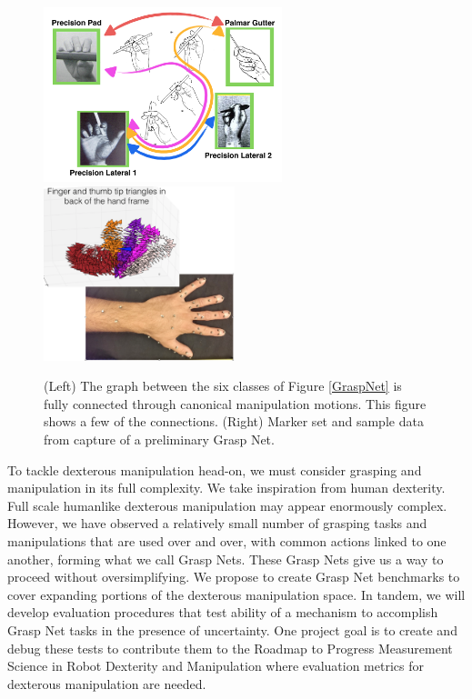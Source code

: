 \begin{figure}
\begin{center}
{\includegraphics[height=2in]{./figs/smallGraspNet.png}}
{\includegraphics[height=2in]{./figs/mocap.png}}
\end{center}
\caption[]{(Left) The graph between the six classes of Figure \ref{GraspNet} is fully connected through canonical manipulation motions.   This figure shows a few of the connections.  (Right) Marker set and sample data from capture of a preliminary Grasp Net.}
\label{GraspNet2}
\end{figure}

To tackle dexterous manipulation head-on, we must consider grasping and manipulation in its full complexity.   We take inspiration from human dexterity.   Full scale humanlike dexterous manipulation may appear enormously complex.   However,  we have observed a relatively small number of grasping tasks and manipulations that are used over and over, with common actions linked to one another, forming what we call Grasp Nets.   These Grasp Nets give us a way to proceed without oversimplifying.  We propose to create Grasp Net benchmarks to cover expanding portions of the dexterous manipulation space.   In tandem, we will develop evaluation procedures that test ability of a mechanism to accomplish Grasp Net tasks in the presence of uncertainty.   One project goal is to create and debug these tests to contribute them to the Roadmap to Progress Measurement Science in Robot Dexterity and Manipulation \cite{falco2014roadmap} where evaluation metrics for dexterous manipulation are needed.   

